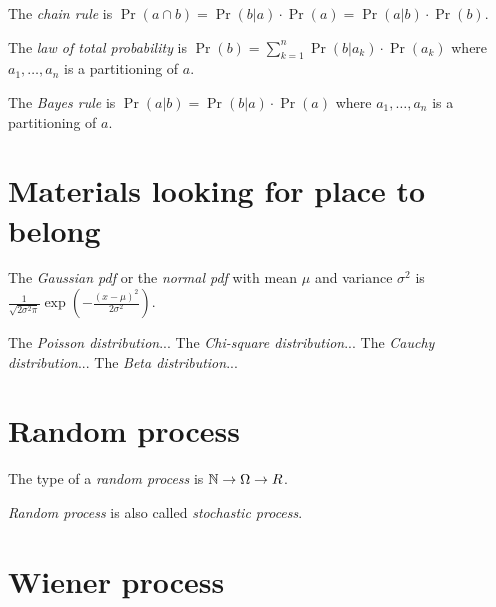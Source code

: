 %
%
%
The \emph{chain rule} is \(\Pr(a \cap b) = \Pr(b|a) \cdot \Pr(a) = \Pr(a|b) \cdot \Pr(b)\).

%
%
%
The \emph{law of total probability} is \(\Pr(b) = \sum_{k=1}^n \Pr(b|a_k) \cdot \Pr(a_k) \)
where \(a_1,\ldots,a_n\) is a partitioning of \(a\).

%
The \emph{Bayes rule} is \(\Pr(a|b) = \Pr(b|a) \cdot \Pr(a)\)
where \(a_1,\ldots,a_n\) is a partitioning of \(a\).

\section{Materials looking for place to belong}

%
%
%
%
%
%
%
%
The \emph{Gaussian pdf} or the \emph{normal pdf}
with mean \(\mu\) and variance \(\sigma^2\) is
\(\frac{1}{\sqrt{2\sigma^2\pi}}\exp\left(-\frac{(x-\mu)^2}{2\sigma^2}\right)\).

%
%
%
%
The \emph{Poisson distribution}...
The \emph{Chi-square distribution}...
The \emph{Cauchy distribution}...
The \emph{Beta distribution}...

\section{Random process}

The type of a \emph{random process} is \(\mathbb{N} \to \Omega \to R\).

\emph{Random process} is also called \emph{stochastic process}.

\section{Wiener process}
